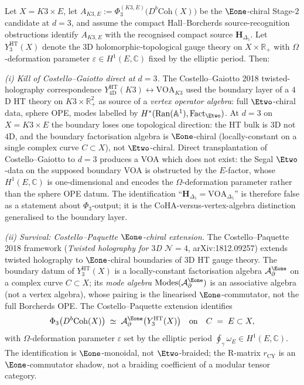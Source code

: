 \begin{proposition}[\texorpdfstring{$\Eone$}{E1}-chiral twisted holography at \texorpdfstring{$d=3$}{d=3}: Costello--Paquette extension and the genus-\texorpdfstring{$2$}{2} shadow of \texorpdfstring{$\mathbf H_{\Delta_5}$}{H-Delta-5}]
\label{prop:qgf-e1-chiral-twisted-holography-k3e}
Let $X=K3\times E$, let
$A_{K3,E}:=\Phi_3^{(K3,E)}\bigl(D^b\mathrm{Coh}(X)\bigr)$ be the
$\Eone$-chiral Stage-$2$ candidate at $d=3$, and assume the compact
Hall--Borcherds source-recognition obstructions identify $A_{K3,E}$ with the
recognised compact source $\mathbf H_{\Delta_5}$. Let
$Y^{\mathrm{HT}}_3(X)$ denote the $3$D holomorphic-topological
gauge theory on $X\times\mathbb R_+$ with $\Omega$-deformation parameter
$\varepsilon\in H^1(E,\mathbb C)$ fixed by the elliptic period. Then:

\emph{(i) Kill of Costello--Gaiotto direct at $d=3$.} The
Costello--Gaiotto 2018 twisted-holography correspondence
$Y^{\mathrm{HT}}_{4\mathrm D}(K3)\leftrightarrow\mathrm{VOA}_{K3}$
used the boundary layer of a $4$D HT theory on $K3\times\mathbb R_+^2$
as source of a \emph{vertex operator algebra}: full $\Etwo$-chiral
data, sphere OPE, modes labelled by
$H^*(\mathrm{Ran}(\mathbb A^1),\mathrm{Fact}_{\Etwo})$. At $d=3$ on
$X=K3\times E$ the boundary loses one topological direction: the HT
bulk is $3$D not $4$D, and the boundary factorisation algebra is
$\Eone$-chiral (locally-constant on a single complex curve $C\subset X$),
not $\Etwo$-chiral. Direct transplantation of Costello--Gaiotto to
$d=3$ produces a VOA which does not exist: the Segal $\Etwo$-data on
the supposed boundary VOA is obstructed by the $E$-factor, whose
$H^1(E,\mathbb C)$ is one-dimensional and encodes the $\Omega$-deformation
parameter rather than the sphere OPE datum. The identification
``$\mathbf H_{\Delta_5}=\mathrm{VOA}_{\Delta_5}$'' is therefore false
as a statement about $\Phi_3$-output; it is the CoHA-versus-vertex-algebra
distinction generalised to the boundary layer.

\emph{(ii) Survival: Costello--Paquette $\Eone$-chiral extension.} The
Costello--Paquette 2018 framework (\emph{Twisted holography for $3$D
$\mathcal N=4$}, arXiv:1812.09257) extends twisted holography to
$\Eone$-chiral boundaries of $3$D HT gauge theory. The boundary
datum of $Y^{\mathrm{HT}}_3(X)$ is a locally-constant factorisation
algebra $\mathcal A^{\Eone}_\partial$ on a complex curve $C\subset X$;
its \emph{mode algebra} $\mathrm{Modes}(\mathcal A^{\Eone}_\partial)$
is an associative algebra (not a vertex algebra), whose pairing is
the linearised $\Eone$-commutator, not the full Borcherds OPE. The
Costello--Paquette extension identifies
\[
 \Phi_3\bigl(D^b\mathrm{Coh}(X)\bigr)
 \;\simeq\;
 \mathcal A^{\Eone}_\partial\bigl(Y^{\mathrm{HT}}_3(X)\bigr)
 \quad\text{on}\quad
 C\;=\;E\subset X,
\]
with $\Omega$-deformation parameter $\varepsilon$ set by the elliptic
period $\oint_\gamma\omega_E\in H^1(E,\mathbb C)$. The identification
is $\Eone$-monoidal, not $\Etwo$-braided; the R-matrix
$r_{\mathrm{CY}}$ is an $\Eone$-commutator shadow, not a braiding
coefficient of a modular tensor category.


\end{proposition}
